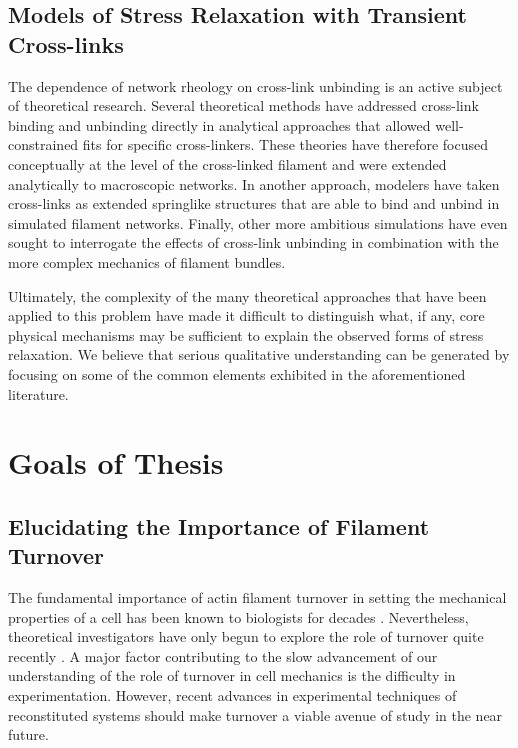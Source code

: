 \subsection{Models of Stress Relaxation with Transient Cross-links}

The dependence of network rheology on cross-link unbinding is an active subject of theoretical research\cite{theo_crosslinkslip2}.  Several theoretical methods have addressed cross-link binding and unbinding directly \cite{theo_crosslinkslip1,theo_crosslinkslip2} in analytical approaches that allowed well-constrained fits for specific cross-linkers.  These theories have therefore focused conceptually at the level of the cross-linked filament and were extended analytically to macroscopic networks.  In another approach, modelers have taken cross-links as extended springlike structures \cite{model_taeyoon} that are able to bind and unbind in simulated filament networks. Finally, other more ambitious simulations have even sought to interrogate the effects of cross-link unbinding in combination with the more complex mechanics of filament bundles\cite{rheo_crosslinkslip2,theo_crosslinkslip3}.

Ultimately, the complexity of the many theoretical approaches that have been applied to this problem have made it difficult to distinguish what, if any, core physical mechanisms may be sufficient to explain the observed forms of stress relaxation.  We believe that serious qualitative understanding can be generated by focusing on some of the common elements exhibited in the aforementioned literature.






\section{Goals of Thesis}

\subsection{Elucidating the Importance of Filament Turnover}

The fundamental importance of actin filament turnover in setting the mechanical properties of a cell has been known to biologists for decades \cite{FEB2:FEB20014579387815132}. Nevertheless, theoretical investigators have only begun to explore the role of turnover quite recently \cite{2015arXiv150706182H,Mak:2016aa,10.1371/journal.pone.0000696}. A major factor contributing to the slow advancement of our understanding of the role of turnover in cell mechanics is the difficulty in experimentation.  However, recent advances in experimental techniques of reconstituted systems should make turnover a viable avenue of study in the near future.  

